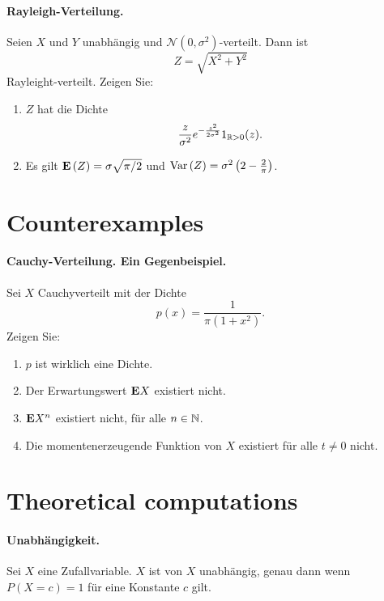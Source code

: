 \paragraph{Rayleigh-Verteilung. }  Seien $X$ und $Y$ unabhängig und 
$\mathcal N (0, \sigma^2)$-verteilt. Dann ist
\begin{equation*}
    Z= \sqrt{X^2 + Y^2} 
\end{equation*}
Rayleight-verteilt. Zeigen Sie:
\begin{enumerate}
    \item $Z$ hat die Dichte
        \begin{equation*}
            \frac{z}{\sigma^2}e^{-\frac{z^2}{2\sigma^2}}1_{\mathbb R>0}(z).
        \end{equation*}
    \item Es gilt $\mathbf{E}\left( Z \right) = \sigma \sqrt{\pi/2}$ und $\operatorname{Var}\left( Z
        \right) = \sigma^2 \left( 2 - \frac{2}{\pi} \right)$.
\end{enumerate}


\section{Counterexamples}

\paragraph{Cauchy-Verteilung. Ein Gegenbeispiel.}
Sei $X$ Cauchyverteilt mit der Dichte
\begin{equation*}
    p(x) = \frac{1}{\pi (1+x^2)}.
\end{equation*}
Zeigen Sie:
\begin{enumerate}
    \item $p$ ist wirklich eine Dichte.
    \item Der Erwartungswert $\mathbf{E} X$ existiert nicht.
    \item $\mathbf{E} X^n$ existiert nicht, für alle $n\in \mathbb N$. 
    \item Die momentenerzeugende Funktion von $X$ existiert für alle $t \neq 0$ nicht. 
\end{enumerate}



\section{Theoretical computations}

\paragraph{Unabhängigkeit.} 
Sei $X$ eine Zufallvariable. $X$ ist von $X$ unabhängig, genau dann wenn
$P(X = c)=1$ für eine Konstante $c$ gilt. %

